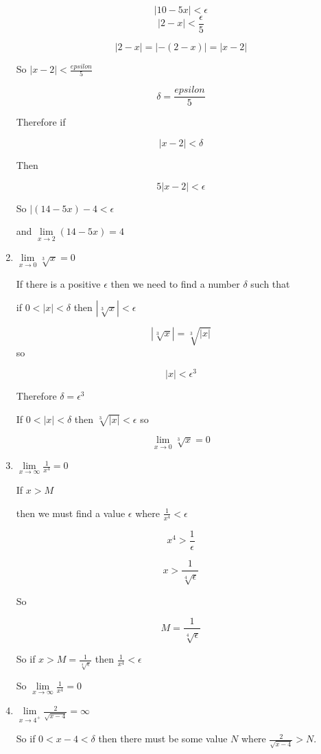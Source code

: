 \documentclass{article}
\begin{document}
\begin{enumerate}
			$$|10 - 5x| < \epsilon$$
			$$|2 - x| < \frac{\epsilon}{5}$$

			$$|2-x| = |-(2-x)| = |x-2|$$

			So $|x - 2| < \frac{epsilon}{5}$

			$$\delta = \frac{epsilon}{5}$$

			Therefore if

			$$|x-2| < \delta$$

			Then

			$$5|x-2| < \epsilon$$

			So $|(14 - 5x) -4 < \epsilon$

			and $\lim \limits _{x \to 2} (14 - 5x) = 4$	

		\item $\lim \limits _{x \to 0} \sqrt[3]{x} = 0$

			If there is a positive $\epsilon$ then we need to find
			a number $\delta$ such that

			if $0 < |x| < \delta$ then $|\sqrt[3]{x}| < \epsilon$

			$$|\sqrt[3]{x}| = \sqrt[3]{|x|}$$ so

			$$|x| < \epsilon^3$$

			Therefore $ \delta = \epsilon^3$

			If $0 < |x| < \delta$ then $\sqrt[3]{|x|} < \epsilon$ so 

			$$\lim \limits _{x \to 0} \sqrt[3]{x} = 0$$

		\item $\lim \limits _{x \to \infty} \frac{1}{x^4} = 0$

			If $x > M$

			then we must find a value $\epsilon$ where $\frac{1}{x^4} < \epsilon$

			$$x^4 > \frac{1}{\epsilon}$$

			$$x > \frac{1}{\sqrt[4]{\epsilon}}$$

			So

			$$M = \frac{1}{\sqrt[4]{\epsilon}}$$

			So if $x > M = \frac{1}{\sqrt[4]{\epsilon}}$ then $\frac{1}{x^4} < \epsilon$

			So $\lim \limits _{x \to \infty} \frac{1}{x^4} = 0$

		\item $\lim \limits _{x \to 4^{+}} \frac{2}{\sqrt{x-4}} = \infty$

			So if $0 < x-4 < \delta$ then there must be some
			value $N$ where $\frac{2}{\sqrt{x-4}} > N$.


\end{enumerate}
\end{document}

